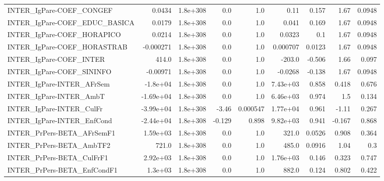 \begin{tabular}{lrrrrrrrr}
INTER\_IgPare-COEF\_CONGEF              &      0.0434 &     1.8e+308 &     0.0 &      1.0 &       0.11 &       0.157 &         1.67 &        0.0948 \\
INTER\_IgPare-COEF\_EDUC\_BASICA         &      0.0179 &     1.8e+308 &     0.0 &      1.0 &      0.041 &       0.169 &         1.67 &        0.0948 \\
INTER\_IgPare-COEF\_HORAPICO            &      0.0214 &     1.8e+308 &     0.0 &      1.0 &     0.0323 &         0.1 &         1.67 &        0.0948 \\
INTER\_IgPare-COEF\_HORASTRAB           &   -0.000271 &     1.8e+308 &     0.0 &      1.0 &   0.000707 &      0.0123 &         1.67 &        0.0948 \\
INTER\_IgPare-COEF\_INTER               &       414.0 &     1.8e+308 &     0.0 &      1.0 &     -203.0 &      -0.506 &         1.66 &         0.097 \\
INTER\_IgPare-COEF\_SININFO             &    -0.00971 &     1.8e+308 &     0.0 &      1.0 &    -0.0268 &      -0.138 &         1.67 &        0.0948 \\
INTER\_IgPare-INTER\_AFrSem             &    -1.8e+04 &     1.8e+308 &     0.0 &      1.0 &   7.43e+03 &       0.858 &        0.418 &         0.676 \\
INTER\_IgPare-INTER\_AmbT               &   -1.69e+04 &     1.8e+308 &     0.0 &      1.0 &   6.46e+03 &       0.974 &          1.5 &         0.134 \\
INTER\_IgPare-INTER\_CulFr              &   -3.99e+04 &     1.8e+308 &   -3.46 & 0.000547 &   1.77e+04 &       0.961 &        -1.11 &         0.267 \\
INTER\_IgPare-INTER\_EnfCond            &   -2.44e+04 &     1.8e+308 &  -0.129 &    0.898 &   9.82e+03 &       0.941 &       -0.167 &         0.868 \\
INTER\_PrPers-BETA\_AFrSemF1            &    1.59e+03 &     1.8e+308 &     0.0 &      1.0 &      321.0 &      0.0526 &        0.908 &         0.364 \\
INTER\_PrPers-BETA\_AmbTF2              &       721.0 &     1.8e+308 &     0.0 &      1.0 &      485.0 &      0.0916 &         1.04 &           0.3 \\
INTER\_PrPers-BETA\_CulFrF1             &    2.92e+03 &     1.8e+308 &     0.0 &      1.0 &   1.76e+03 &       0.146 &        0.323 &         0.747 \\
INTER\_PrPers-BETA\_EnfCondF1           &     1.3e+03 &     1.8e+308 &     0.0 &      1.0 &      882.0 &       0.124 &        0.802 &         0.422 \\

\end{tabular}
